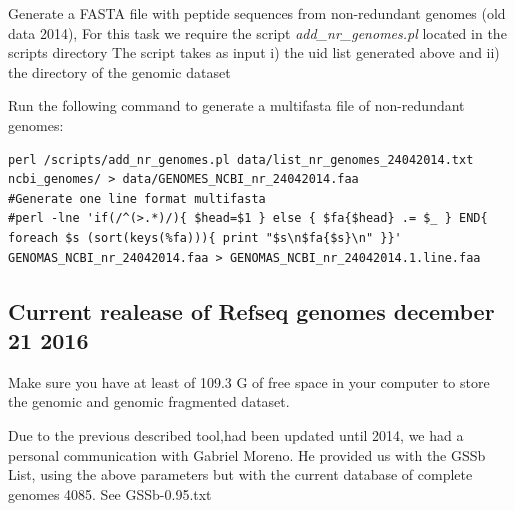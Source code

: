 \documentclass[a4paper,11pt]{report}
\begin{document}
Generate a FASTA file with peptide sequences from non-redundant genomes (old data 2014), For this task we require the script  \textit{add\_nr\_genomes.pl} located in the scripts directory 
The script takes as input i) the uid list generated above and ii) the directory of the genomic dataset 

Run the following command to generate a multifasta file of non-redundant genomes:
\begin{verbatim}
perl /scripts/add_nr_genomes.pl data/list_nr_genomes_24042014.txt 
ncbi_genomes/ > data/GENOMES_NCBI_nr_24042014.faa
#Generate one line format multifasta 
#perl -lne 'if(/^(>.*)/){ $head=$1 } else { $fa{$head} .= $_ } END{ 
foreach $s (sort(keys(%fa))){ print "$s\n$fa{$s}\n" }}' 
GENOMAS_NCBI_nr_24042014.faa > GENOMAS_NCBI_nr_24042014.1.line.faa

\end{verbatim}

\subsection{Current realease of Refseq genomes  december 21 2016 }

Make sure you have at least of 109.3 G of free space in your computer to store the genomic and genomic fragmented dataset. 

Due to the previous described tool,had been updated until 2014, we had a personal communication with Gabriel Moreno. He provided us with the  GSSb List, using the above parameters but with the current database of complete genomes 4085. See GSSb-0.95.txt
\end{document}
